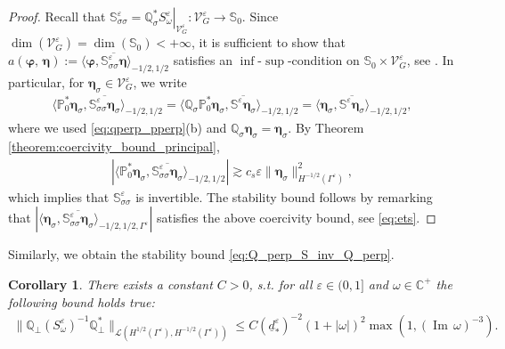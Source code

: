 \documentclass[]{article}
\newtheorem{corollary}{Corollary}
\numberwithin{equation}{section}
\numberwithin{theorem}{section}
\numberwithin{lemma}{section}
\numberwithin{corollary}{section}
\numberwithin{proposition}{section}
\numberwithin{definition}{section}
\newcommand{\re}{\varepsilon}
\renewcommand{\vec}{\boldsymbol}
\renewcommand{\Im}{\operatorname{Im}}
\begin{document}
	\begin{proof}
		Recall that $\mathbb{S}^{\re}_{\sigma \sigma} = \left.\mathbb{Q}^*_{\sigma} S^{\re}_{\omega}\right|_{\mathcal{V}^{\re}_G}: \mathcal{V}^{\re}_G \to \mathbb{S}_0$. Since  $\dim(\mathcal{V}^{\re}_G) = \dim(\mathbb{S}_0) < +\infty$, it is sufficient to show that $a(\vec{\varphi}, \, \vec{\eta}):=\langle \vec{\varphi}, \overline{\mathbb{S}^{\re}_{\sigma \sigma}\vec{\eta}}\rangle_{-1/2,1/2}$ satisfies an $\operatorname{inf}$-$\operatorname{sup}$-condition on $\mathbb{S}_0\times \mathcal{V}_G^{\re}$, see \cite[Section 3.4.2]{boffi}. In particular, for $\vec{\eta}_{\sigma}\in \mathcal{V}^{\re}_G$, we write
		\begin{align}
			\label{eq:ets}
			\langle \mathbb{P}_0^*\vec{\eta}_{\sigma}, \overline{\mathbb{S}^{\re}_{\sigma\sigma}\vec{\eta}_{\sigma}}\rangle_{-1/2,1/2} = \langle \mathbb{Q}_{\sigma}\mathbb{P}_0^*\vec{\eta}_{\sigma}, \overline{\mathbb{S}^{\re}\vec{\eta}_{\sigma}}\rangle_{-1/2,1/2} =\langle \vec{\eta}_{\sigma}, \overline{\mathbb{S}^{\re}\vec{\eta}_{\sigma}}\rangle_{-1/2,1/2},
		\end{align}
		where we used \eqref{eq:qperp_pperp}(b) and $\mathbb{Q}_{\sigma}\vec{\eta}_{\sigma}=\vec{\eta}_{\sigma}$. By Theorem \ref{theorem:coercivity_bound_principal},
		\begin{align*}
			\left|	\langle \mathbb{P}_0^*\vec{\eta}_{\sigma}, \overline{\mathbb{S}^{\re}_{\sigma\sigma}\vec{\eta}_{\sigma}}\rangle_{-1/2,1/2} \right|\gtrsim c_s\re \|\vec{\eta}_{\sigma}\|^2_{H^{-1/2}(\Gamma^{\re})},
		\end{align*}
		which implies that $\mathbb{S}^{\re}_{\sigma\sigma}$ is invertible. The stability bound follows by remarking that $|\langle \vec{\eta}_{\sigma}, \overline{\mathbb{S}^{\re}_{\sigma\sigma}\vec{\eta}_{\sigma}}\rangle_{-1/2,1/2, \Gamma^{\re}}|$ satisfies the above coercivity bound, see \eqref{eq:ets}. 
	\end{proof}
	Similarly, we obtain the stability bound \eqref{eq:Q_perp_S_inv_Q_perp}.  
	\begin{corollary}
		There exists a constant $C>0$, s.t. for all $\re \in (0,1]$ and $\omega \in \mathbb{C}^+$ the following bound holds true:
		\begin{align*}%
			\| \mathbb{Q}_{\perp} (S^{\re}_{\omega})^{-1} \mathbb{Q}_{\perp}^* \|_{\mathcal{L}(H^{1/2}(\Gamma^{\re}), H^{-1/2} (\Gamma^{\re}))} \leq C(\underline{d}^{\re}_{*})^{-2} (1+ |\omega| )^2 \max(1, (\Im \, \omega)^{-3}).
		\end{align*}
	\end{corollary}
\end{document}
